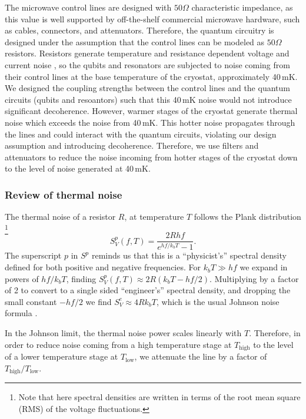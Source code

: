 The microwave control lines are designed with $50\Omega$ characteristic impedance, as this value is well supported by off-the-shelf commercial microwave hardware, such as cables, connectors, and attenuators.
Therefore, the quantum circuitry is designed under the assumption that the control lines can be modeled as $50\Omega$ \, resistors.
Resistors generate temperature and resistance dependent voltage and current noise \cite{Nyquist:noise1928}, so the qubits and resonators are subjected to noise coming from their control lines at the base temperature of the cryostat, approximately 40\,mK.
We designed the coupling strengths between the control lines and the quantum circuits (qubits and resoantors) such that this 40\,mK noise would not introduce significant decoherence.
However, warmer stages of the cryostat generate thermal noise which exceeds the noise from 40\,mK.
This hotter noise propagates through the lines and could interact with the quantum circuits, violating our design assumption and introducing decoherence.
Therefore, we use filters and attenuators to reduce the noise incoming from hotter stages of the cryostat down to the level of noise generated at 40\,mK.

\subsubsection{Review of thermal noise}

The thermal noise of a resistor $R$, at temperature $T$ follows the Plank distribution \footnote{Note that here spectral densities are written in terms of the root mean square (RMS) of the voltage fluctuations.} \begin{equation}
S^p_V(f, T) = \frac{2R h f}{e^{h f /k_b T} - 1} . \end{equation}
The superscript $p$ in $S^p$ reminds us that this is a ``physicist's'' spectral density defined for both positive and negative frequencies.
For $k_bT \gg h f$ we expand in powers of $hf / k_b T$, finding $S^p_V(f, T) \approx 2R \left( k_b T - h f / 2 \right)$.
Multiplying by a factor of 2 to convert to a single sided ``engineer's'' spectral density, and dropping the small constant $-hf / 2$ we find $S^e_V \approx 4 R k_bT$, which is the usual Johnson noise formula \cite{Johnson:noise1928, Nyquist:noise1928}.

In the Johnson limit, the thermal noise power scales linearly with $T$.
Therefore, in order to reduce noise coming from a high temperature stage at $T_{\text{high}}$ to the level of a lower temperature stage at $T_{\text{low}}$, we attenuate the line by a factor of $T_{\text{high}} / T_{\text{low}}$.

